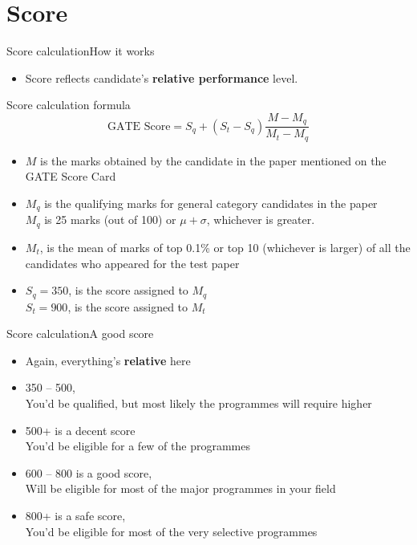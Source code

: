 \documentclass[handout]{beamer}
\begin{document}
\section{Score}
\begin{frame}{Score calculation}{How it works}
    \begin{itemize}
        \item Score reflects candidate's \textbf{relative performance} level.
    \end{itemize}

    \begin{block}{Score calculation formula}
        \begin{equation*}
            \text{GATE Score} = S_{q} + (S_{t} - S_{q}) {\frac {M - M_{q}}{{M}_{t} - M_{q}}}
        \end{equation*}
    \end{block}

    \begin{itemize}
        \item $M$ is the marks obtained by the candidate in the paper mentioned on the GATE Score Card
        \item $M_{q}$ is the qualifying marks for general category candidates in the paper \\
              $M_{q}$ is 25 marks (out of 100) or $\mu + \sigma$, whichever is greater.
        \item $M_{t}$, is the mean of marks of top 0.1\% or top 10 (whichever is larger) of all the candidates who appeared for the test paper
        \item $S_{q} = 350$, is the score assigned to $M_{q}$ \\
              $S_{t} = 900$, is the score assigned to $M_{t}$
    \end{itemize}
\end{frame}

\begin{frame}{Score calculation}{A good score}
    \begin{itemize}
        \item Again, everything's \textbf{relative} here
        \item 350  -- 500, \\ You'd be qualified, but most likely the programmes will require higher
        \item 500+ is a decent score \\ You'd be eligible for a few of the programmes
        \item 600 -- 800 is a good score, \\ Will be eligible for most of the major programmes in your field
        \item 800+ is a safe score, \\ You'd be eligible for most of the very selective programmes
    \end{itemize}
\end{frame}
\end{document}
